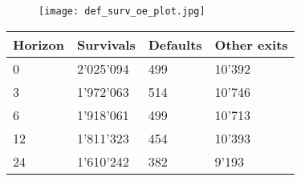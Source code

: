 \begin{figure}[H]
    \centering
    \texttt{[image: def\_surv\_oe\_plot.jpg]}
    \label{fig:defsurv}
\end{figure}

\begin{table}[]
    \centering
    \begin{tabular}{l l l l}
    \hline\hline
Horizon & Survivals & Defaults & Other exits \\
    \hline
0 &  2'025'094 & 499 & 10'392\\
3 &  1'972'063 & 514 & 10'746\\
6 &  1'918'061 & 499 & 10'713\\
12 &  1'811'323 & 454 & 10'393\\
24 &  1'610'242 & 382 & 9'193\\

\end{tabular}
\end{table}

